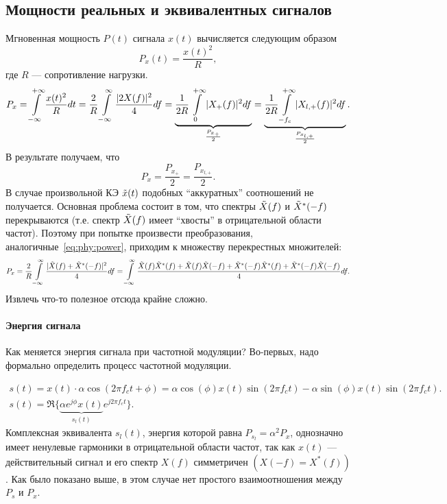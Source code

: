 \documentclass{book}
\numberwithin{theorem}{chapter}
\numberwithin{statement}{chapter}
\numberwithin{lemma}{chapter}
\theoremstyle{definition}
\numberwithin{task}{chapter}
\theoremstyle{remark}
\numberwithin{example}{chapter}
\theoremstyle{definition}
\numberwithin{definition}{chapter}
\theoremstyle{remark}
\theoremstyle{remark}
\numberwithin{lyrics}{section}
\begin{document}
\subsection{Мощности реальных и эквивалентных сигналов}
Мгновенная мощность $P(t)$ сигнала $x(t)$ вычисляется следующим образом
\begin{equation}
P_x(t) = \frac{x(t)^2}{R},
\end{equation}
где $R$ --- сопротивление нагрузки.
\begin{equation}
\label{eq:phy:power}
P_x = \int\limits_{-\infty}^{+\infty}\frac{x(t)^2}{R} dt = \frac{2}{R} \int\limits_{-\infty}^{\infty} \frac{|2X(f)|^2}{4} df = \underbrace{\frac{1}{2R} \int\limits^{+\infty}_{0} |X_+(f)|^2 df}_{{\frac{P_{x_{+}}}{2}}}  = \underbrace{\frac{1}{2R} \int\limits_{-f_c}^{+\infty} |X_{l,+}(f)|^2 df}_{\frac{P_{x_{l,+}}}{2}}.
\end{equation}
В результате получаем, что
\begin{equation}
P_x = \frac{P_{x_{+}}}{2} = \frac{P_{x_{l,+}}}{2}.
\end{equation}
В случае произвольной КЭ $\tilde{x}(t)$ подобных ``аккуратных'' соотношений не получается. Основная проблема состоит в том, что спектры $\tilde{X}(f)$ и $\tilde{X}^*(-f)$ перекрываются (т.е. спектр $\tilde{X}(f)$ имеет ``хвосты'' в отрицательной области частот). Поэтому при попытке произвести преобразования, аналогичные~\eqref{eq:phy:power}, приходим к множеству перекрестных множителей:
\begin{equation}
\notag
P_x = \frac{2}{R} \int\limits_{-\infty}^{\infty} \frac{|\tilde{X}(f) + \tilde{X}^*(-f)|^2}{4} df = \int\limits_{-\infty}^{\infty} \frac{\tilde{X}(f) \tilde{X}^*(f) + \tilde{X}(f) \tilde{X}(-f) + \tilde{X}^*(-f) \tilde{X}^*(f) + \tilde{X}^*(-f) \tilde{X}(-f)}{4} df.
\end{equation}
Извлечь что-то полезное отсюда крайне сложно.

\paragraph{Энергия сигнала}
Как меняется энергия сигнала при частотной модуляции? Во-первых, надо формально определить процесс частотной модуляции.

\begin{gather}
s(t) = x(t) \cdot \alpha \cos(2\pi f_c t + \phi) = \alpha \cos (\phi) x(t) \sin (2\pi f_c t) - \alpha \sin (\phi) x(t) \sin(2\pi f_c t). \\
s(t) = \Re\{\underbrace{\alpha e^{j\phi} x(t)}_{s_l(t)} e^{j2\pi f_c t}\}.
\end{gather}
Комплексная эквивалента $s_l(t)$, энергия которой равна $P_{s_l} = \alpha^2 P_x$, однозначно имеет ненулевые гармоники в отрицательной области частот, так как $x(t)$ --- действительный сигнал и его спектр $X(f)$ симметричен $(X(-f) = X^*(f))$. Как было показано выше, в этом случае нет простого взаимоотношения между $P_s$ и $P_x$.
\end{document}
